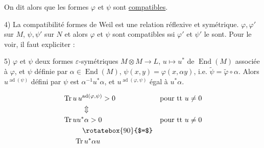 
On dit alors que les formes $\varphi$ et $\psi$  sont \uline{compatibles}.

4) La compatibilité  formes de Weil est une relation  réflexive et symétrique.   $\varphi,\varphi'$ sur $M$, $\psi,\psi'$ sur $N$ et   alors $\varphi$ et $\psi$ sont compatibles ssi $\varphi'$ et $\psi'$ le sont. Pour le voir, il faut expliciter :


5)  $\varphi$ et $\psi$ deux formes $\varepsilon$-symétriques $M\otimes M\to L$,  $u\mapsto u^*$ de $\operatorname{End}(M)$ associée à $\varphi$, et $\psi$ définie par $\alpha\in\operatorname{End}(M)$, $\psi(x,y)=\varphi(x,\alpha y)$, i.e. $\widetilde\psi=\widetilde\varphi\circ\alpha$. Alors $u^{\operatorname{ad}(\psi)}$ défini par $\psi$ est   $\alpha^{-1}u^*\alpha$,  et $u^{\operatorname{ad}(\varphi,\psi)}$  égal à $u^*\alpha$. 

\[
\begin{aligned}
&\operatorname{Tr}u\,u^{\operatorname{ad}(\varphi,\psi)}>0 &&\text{pour tt }u\ne0\\
&\hspace{2.7em}\Updownarrow\\
&\operatorname{Tr}uu^*\alpha>0 &&\text{pour tt }u\ne0\\
&\hspace{2.7em}\rotatebox{90}{$=$}\\
&\hspace{1.6em}\operatorname{Tr}u^*\alpha u
\end{aligned}
\]

